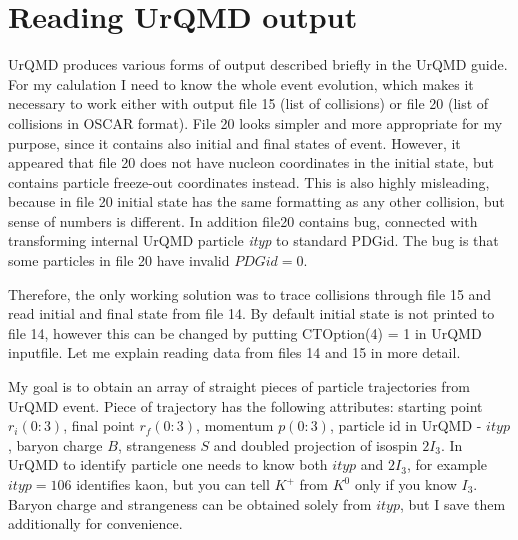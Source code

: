 \documentclass[12pt,a4paper]{report}
\begin{document}
\section{Reading UrQMD output}

UrQMD produces various forms of output described briefly in the UrQMD guide. For my calulation I need to know the whole event evolution, which makes it necessary to work either with output file 15 (list of collisions) or file 20 (list of collisions in OSCAR format). File 20 looks simpler and more appropriate for my purpose, since it contains also initial and final states of event. However, it appeared that file 20 does not have nucleon coordinates in the initial state, but contains particle freeze-out coordinates instead. This is also highly misleading, because in file 20 initial state has the same formatting as any other collision, but sense of numbers is different. In addition file20 contains bug, connected with transforming internal UrQMD particle \emph{ityp} to standard PDGid. The bug is that some particles in file 20 have invalid $PDGid = 0$. 

Therefore, the only working solution was to trace collisions through file 15 and read initial and final state from file 14. By default initial state is not printed to file 14, however this can be changed by putting CTOption(4) = 1 in UrQMD inputfile. Let me explain reading data from files 14 and 15 in more detail.

My goal is to obtain an array of straight pieces of particle trajectories from UrQMD event. Piece of trajectory has the following attributes: starting point $r_i(0:3)$, final point $r_f(0:3)$, momentum $p(0:3)$, particle id in UrQMD - $ityp$, baryon charge $B$, strangeness $S$ and doubled projection of isospin $2I_3$. In UrQMD to identify particle one needs to know both $ityp$ and $2I_3$, for example $ityp = 106$ identifies kaon, but you can tell $K^+$ from $K^0$ only if you know $I_3$. Baryon charge and strangeness can be obtained solely from $ityp$, but I save them additionally for convenience.
\end{document}
